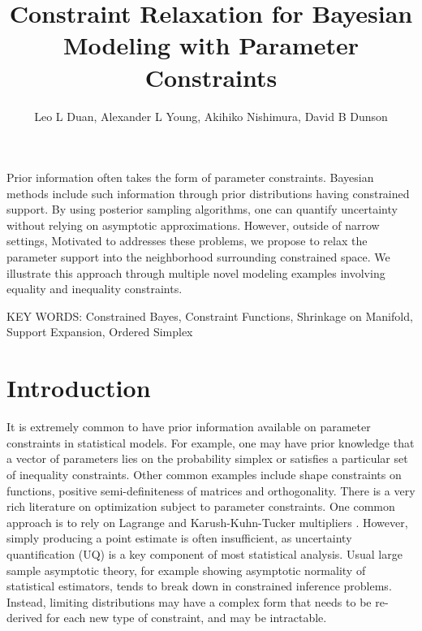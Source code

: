 \documentclass[10pt,fleqn]{article} \pdfoutput=1
\title{\textbf{Constraint Relaxation for Bayesian Modeling with Parameter
Constraints}}
\author{Leo L Duan, Alexander L Young, Akihiko Nishimura, David B Dunson}
\date{}
\newcommand{\leo}[1]{{\color{blue}{#1}}}
\DeclareMathOperator{\1}{\mathbbm{1}} \DeclareMathOperator{\bigO}{\mc O}
\begin{document}
 Prior information often takes  the form of
parameter constraints. Bayesian methods include such information through
prior distributions having constrained support. By using posterior sampling
algorithms, one can quantify uncertainty without relying on asymptotic
approximations. However, outside of narrow settings, \leo{the choices of
priors and efficient sampling algorithms are severely limited.
} Motivated to addresses these problems, we propose to relax the parameter support into the neighborhood
surrounding constrained space. \leo{
This allows us to utilize the much larger family of prior distributions and off--the--shelf sampling
algorithms available in general unconstrained space.
The relaxed model can be directly used for statistical inference, or viewed
as an approximate solution to the original constrained problem. We study
the constrained and relaxed distributions under multiple settings, and
theoretically quantify their differences. Popular state--of--art
sampling algorithms such as leap-frog Hamiltonian Monte Carlo can be
directly utilized with almost no customization.} We illustrate this approach
through multiple novel modeling examples involving equality and inequality constraints.

\vskip 12pt
	{\noindent KEY WORDS: Constrained Bayes, Constraint
		Functions, Shrinkage on Manifold, Support Expansion, Ordered Simplex}
{}

\newpage

\section{Introduction}

It is extremely common to have prior information available on parameter
constraints in statistical models. For example, one may have prior
knowledge that a vector of parameters lies on the probability simplex or
satisfies a particular set of inequality constraints. Other common examples
include shape constraints on functions, positive semi-definiteness of
matrices and orthogonality. There is a very rich literature on optimization
subject to parameter constraints. One common approach is to rely on Lagrange
and Karush-Kuhn-Tucker multipliers \citep{boyd2004convex}. However, simply
producing a point estimate is often insufficient, as uncertainty
quantification (UQ) is a key component of most statistical analysis. Usual
large sample asymptotic theory, for example showing asymptotic normality of
statistical estimators, tends to break down in constrained inference
problems. Instead, limiting distributions may have a complex form that
needs to be re-derived for each new type of constraint, and may be
intractable. 
\end{document}
